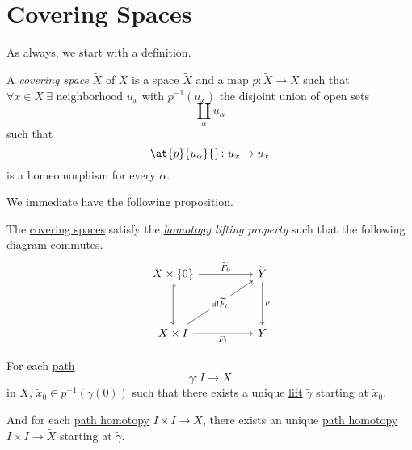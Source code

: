\section{Covering Spaces}
As always, we start with a definition.
\begin{definition}\label{def:covering-space}
	A \emph{covering space} \(\widetilde{X} \) of \(X\) is a space \(\widetilde{X} \) and a map \(p\colon \widetilde{X} \to X\)
	such that \(\forall x\in X\ \exists \text{ neighborhood } u_{x}\) with \(p^{-1} (u_{x})\) the disjoint union of open sets
	\[
		\coprod_\alpha u_\alpha
	\]
	such that
	\[
		\at{p}{u_\alpha }{} \colon u_{x}\to u_{x}
	\]
	is a homeomorphism for every \(\alpha \).
	\begin{figure}[H]
		\centering
		\label{fig:def:covering-space}
	\end{figure}
\end{definition}

We immediate have the following proposition.
\begin{proposition}\label{prop:homotopy-lifting-property}
	The \hyperref[def:covering-space]{covering spaces} satisfy the \emph{\hyperref[def:homotopy]{homotopy} lifting property} such that
	the following diagram commutes.
	\[
		\begin{tikzcd}
			{X\times \{0\}} && {\widetilde{Y} } \\
			\\
			{X\times I} && Y
			\arrow["{F_t}"', from=3-1, to=3-3]
			\arrow[hook, from=1-1, to=3-1]
			\arrow["{\widetilde{F}_0 }", from=1-1, to=1-3]
			\arrow["p", from=1-3, to=3-3]
			\arrow["{\exists ! \widetilde{F}_t }"{description}, from=3-1, to=1-3]
		\end{tikzcd}
	\]
\end{proposition}

\begin{corollary}
	For each \hyperref[def:path]{path}
	\[
		\gamma \colon I\to X
	\]
	in \(X\), \(\widetilde{x} _0\in p^{-1} (\gamma (0)) \) such that there exists a unique \hyperref[prop:homotopy-lifting-property]{lift}
	\(\widetilde{\gamma} \) starting at \(\widetilde{x} _0\).

	\par And for each \hyperref[def:homotopy-path]{path homotopy} \(I\times I\to X\), there exists an unique \hyperref[def:homotopy-path]{path homotopy}
	\(I\times I\to \widetilde{X} \) starting at \(\widetilde{\gamma} \).
	\begin{figure}[H]
		\centering
		\label{fig:col:lec14:1}
	\end{figure}
\end{corollary}

